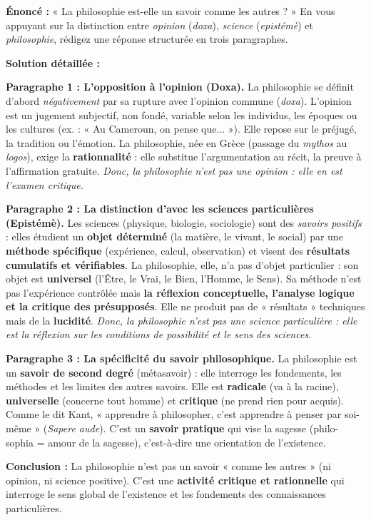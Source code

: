 \documentclass[11pt]{article}
\begin{document}
\begin{exoresolu}
\textbf{Énoncé :} « La philosophie est-elle un savoir comme les autres ? » En vous appuyant sur la distinction entre \emph{opinion} (\emph{doxa}), \emph{science} (\emph{epistémè}) et \emph{philosophie}, rédigez une réponse structurée en trois paragraphes.

\tcblower
\textbf{Solution détaillée :}

\textbf{Paragraphe 1 : L'opposition à l'opinion (Doxa).}
La philosophie se définit d'abord \emph{négativement} par sa rupture avec l'opinion commune (\emph{doxa}). L'opinion est un jugement subjectif, non fondé, variable selon les individus, les époques ou les cultures (ex. : « Au Cameroun, on pense que... »). Elle repose sur le préjugé, la tradition ou l'émotion. La philosophie, née en Grèce (passage du \emph{mythos} au \emph{logos}), exige la \textbf{rationnalité} : elle substitue l'argumentation au récit, la preuve à l'affirmation gratuite. \emph{Donc, la philosophie n'est pas une opinion : elle en est l'examen critique.}

\textbf{Paragraphe 2 : La distinction d'avec les sciences particulières (Epistémè).}
Les sciences (physique, biologie, sociologie) sont des \emph{savoirs positifs} : elles étudient un \textbf{objet déterminé} (la matière, le vivant, le social) par une \textbf{méthode spécifique} (expérience, calcul, observation) et visent des \textbf{résultats cumulatifs et vérifiables}. La philosophie, elle, n'a pas d'objet particulier : son objet est \textbf{universel} (l'Être, le Vrai, le Bien, l'Homme, le Sens). Sa méthode n'est pas l'expérience contrôlée mais \textbf{la réflexion conceptuelle, l'analyse logique et la critique des présupposés}. Elle ne produit pas de « résultats » techniques mais de la \textbf{lucidité}. \emph{Donc, la philosophie n'est pas une science particulière : elle est la réflexion sur les conditions de possibilité et le sens des sciences.}

\textbf{Paragraphe 3 : La spécificité du savoir philosophique.}
La philosophie est un \textbf{savoir de second degré} (métasavoir) : elle interroge les fondements, les méthodes et les limites des autres savoirs. Elle est \textbf{radicale} (va à la racine), \textbf{universelle} (concerne tout homme) et \textbf{critique} (ne prend rien pour acquis). Comme le dit Kant, « apprendre à philosopher, c'est apprendre à penser par soi-même » (\emph{Sapere aude}). C'est un \textbf{savoir pratique} qui vise la sagesse (philo-sophia = amour de la sagesse), c'est-à-dire une orientation de l'existence.

\textbf{Conclusion :} La philosophie n'est pas un savoir « comme les autres » (ni opinion, ni science positive). C'est une \textbf{activité critique et rationnelle} qui interroge le sens global de l'existence et les fondements des connaissances particulières.
\end{exoresolu}
\end{document}
